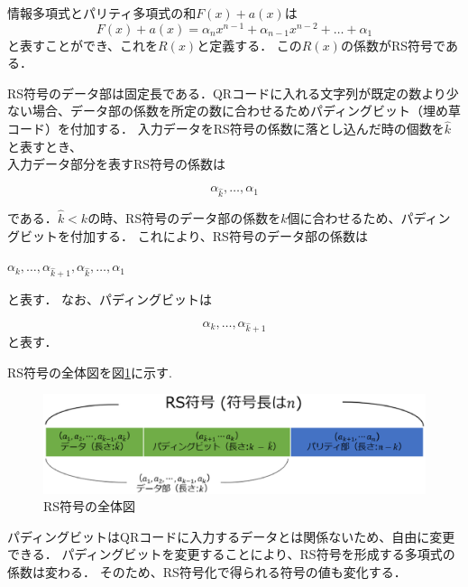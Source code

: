 \documentclass{thesis}
\begin{document}
情報多項式とパリティ多項式の和$F(x)+a(x)$は
\begin{equation}
F(x)+a(x)= \alpha_{n} x^{n-1}+\alpha_{n-1}x^{n-2}+…+\alpha_1 
\label{eq:pol}
\end{equation}
と表すことができ、これを$R(x)$と定義する．
この$R(x)$の係数がRS符号である．


RS符号のデータ部は固定長である．QRコードに入れる文字列が既定の数より少ない場合、データ部の係数を所定の数に合わせるためパディングビット（埋め草コード）を付加する．
入力データをRS符号の係数に落とし込んだ時の個数を$\hat{k}$と表すとき、\\
入力データ部分を表すRS符号の係数は

\begin{equation}
\alpha_{\hat{k}},…,\alpha_1
\label{eq:pol1}
\end{equation}

である．$\hat{k} < k$の時、RS符号のデータ部の係数を$k$個に合わせるため、パディングビットを付加する．
これにより、RS符号のデータ部の係数は

\begin{center}
$\alpha_{k},…,\alpha_{\hat{k} + 1},\alpha_{\hat{k}},…,\alpha_1$
\end{center}
と表す．
なお、パディングビットは
 
 \begin{equation}
 \alpha_{k},…,\alpha_{\hat{k} + 1}
\label{eq:pol3}
\end{equation}
と表す．\\

\newpage

RS符号の全体図を図\ref{RScode}に示す.

\begin{figure}[H]
 \centering
 \includegraphics[width=1\linewidth]{pic/RScode.eps}
 \caption{RS符号の全体図\label{RScode}}
\end{figure}

パディングビットはQRコードに入力するデータとは関係ないため、自由に変更できる．
パディングビットを変更することにより、RS符号を形成する多項式の係数は変わる．
そのため、RS符号化で得られる符号の値も変化する．
\end{document}
